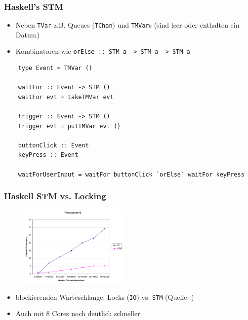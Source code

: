 \documentclass[t]{beamer}
\begin{document}
\begin{frame}[fragile]
  \frametitle{Haskell's STM}

  \begin{itemize}
  \item Neben \lstinline|TVar| z.B. Queues (\lstinline|TChan|) und \lstinline|TMVar|s
        (sind leer oder enthalten ein Datum)
  \item Kombinatoren wie \lstinline|orElse :: STM a -> STM a -> STM a|
  \end{itemize}

  \begin{lstlisting}
    type Event = TMVar ()

    waitFor :: Event -> STM ()
    waitFor evt = takeTMVar evt

    trigger :: Event -> STM ()
    trigger evt = putTMVar evt ()

    buttonClick :: Event
    keyPress :: Event

    waitForUserInput = waitFor buttonClick `orElse` waitFor keyPress
  \end{lstlisting}
\end{frame}

\begin{frame}[fragile]
  \frametitle{Haskell STM vs. Locking}
  \begin{figure}[!t]
    \includegraphics[width=200px]{haskell_stm.png}
    \label{fig:haskell_stm}
  \end{figure}
  \begin{itemize}
  \item blockierenden Warteschlange: Locks (\lstinline|IO|) vs. \lstinline|STM| (Quelle:
            \cite[Abbildung 2]{HaskellLockFreeDat})
  \item Auch mit 8 Cores noch deutlich schneller \cite{HaskellLockFreeDat}
  \end{itemize}
\end{frame}
\end{document}
